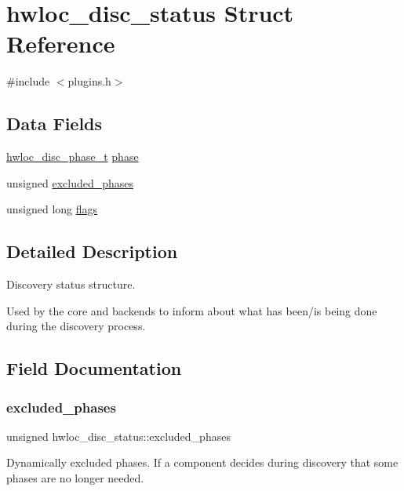 \hypertarget{a00370}{}\section{hwloc\+\_\+disc\+\_\+status Struct Reference}
\label{a00370}


{\ttfamily \#include $<$plugins.\+h$>$}

\subsection*{Data Fields}
\begin{DoxyCompactItemize}
\item 
\hyperlink{a00228_ga3beef9f01f1c08c5700aec066fcec025}{hwloc\+\_\+disc\+\_\+phase\+\_\+t} \hyperlink{a00370_abaf7c8c082d43e133171f0723dbf824b}{phase}
\item 
unsigned \hyperlink{a00370_a0f95fa42d46a6e7cf8dee8af12afee3a}{excluded\+\_\+phases}
\item 
unsigned long \hyperlink{a00370_ad8b123cecb945a9182eb824ccf8ef9d7}{flags}
\end{DoxyCompactItemize}


\subsection{Detailed Description}
Discovery status structure. 

Used by the core and backends to inform about what has been/is being done during the discovery process. 

\subsection{Field Documentation}
\mbox{\label{a00370_a0f95fa42d46a6e7cf8dee8af12afee3a}} 
\subsubsection{\texorpdfstring{excluded\+\_\+phases}{excluded\_phases}}
{\footnotesize\ttfamily unsigned hwloc\+\_\+disc\+\_\+status\+::excluded\+\_\+phases}



Dynamically excluded phases. If a component decides during discovery that some phases are no longer needed. 

